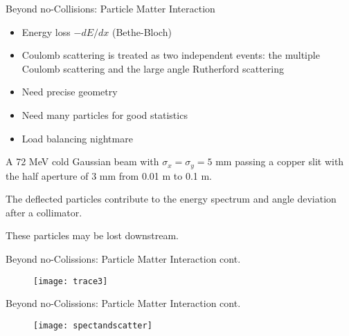 \documentclass[xcolor=pdftex,table,10pt,yellow,mathserif]{beamer}
\begin{document}
\begin{frame}{Beyond no-Collisions: Particle Matter Interaction}{}
 \begin{itemize}
 \item Energy loss $-dE/dx$ (Bethe-Bloch)
 \item Coulomb scattering is treated as two independent events: the multiple Coulomb scattering and the large angle Rutherford scattering
 \item Need precise geometry 
 \item Need many particles for good statistics
 \item Load balancing nightmare 
 \end{itemize}

A 72 MeV cold Gaussian beam with $\sigma_x=\sigma_y=5$ mm passing a copper slit with the half aperture of $3$ mm from 0.01 m to 0.1 m. 

The deflected particles contribute to the energy spectrum and angle deviation after a collimator. 

These particles may be lost downstream.
\end{frame}

\begin{frame}{Beyond no-Colissions: Particle Matter Interaction cont.}{}
\begin{figure}[htb]
   \centering
  \texttt{[image: trace3]}
\end{figure}
\end{frame}


\begin{frame}{Beyond no-Colissions: Particle Matter Interaction cont.}{}
 
\begin{figure}[htb]
   \centering
  \texttt{[image: spectandscatter]}
 \end{figure}

\end{frame}
\end{document}
